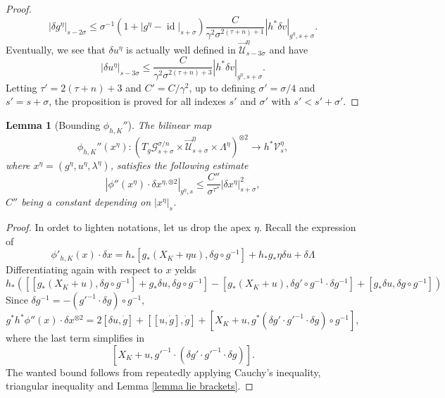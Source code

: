 \documentclass[oneside, 11pt]{amsbook}
\newcommand{\sq}[1]{{\left[#1\right]}}
\newcommand{\abs}[1]{{\left|#1\right|}}
\newcommand{\U}{\mathcal{U}}
\newcommand{\inderiv}[1]{#1'^{-1}}
\newcommand{\pull}[1]{#1^\ast} %
\newcommand{\push}[1]{#1_\ast}%
\newcommand{\id}{\operatorname{id}}
\def\U{{\mathcal U}}
\newcommand{\0}{{(0)}}
\newcommand{\3}{{(3)}}
\newtheorem{lemma}{Lemma}
\numberwithin{equation}{section}
\numberwithin{defn}{section}
\numberwithin{prop}{section}
\numberwithin{cor}{section}
\numberwithin{lemma}{section}
\numberwithin{rmk}{section}
\numberwithin{corollary}{section}
\begin{document}
\begin{proof}
\[\abs{\delta g^\eta}_{s-2\sigma} \leq \sigma^{-1}(1 + \abs{g^\eta - \id}_{s+\sigma}) \frac{C}{\gamma^2\sigma^{2(\tau +n) +1}}\abs{h^*\delta v}_{g^\eta,s+\sigma}. \] 
Eventually, we see that $\delta u^\eta$ is actually well defined in $\overrightarrow{\U}^\eta_{s-3\sigma}$ and have \[\abs{\delta u^\eta}_{s-3\sigma}\leq \frac{C}{\gamma^2\sigma^{2(\tau + n) +3}}\abs{h^*\delta v}_{g^\eta,s+\sigma}.\]
Letting $\tau'= 2(\tau + n) + 3$ and $C'= C/\gamma^2$, up to defining $\sigma' = \sigma/4$ and $s'= s+\sigma$, the proposition is proved for all indexes $s'$ and $\sigma'$ with $s'<s' + \sigma'$.

\end{proof}
\begin{lemma}[Bounding $\phi_{h,K} ''$]
\label{bound phi''}
	The bilinear map
	\[\phi_{h,K} ''(x^\eta) : (T_g\mathcal{G}_{s+\sigma}^{\sigma/n}\times\overrightarrow{\mathcal{U}}^\eta_{s+\sigma}\times\Lambda^\eta)^{\otimes 2}\to h^*\mathcal{V}^\eta_{s}, \] where $x^\eta = (g^\eta,u^\eta,\lambda^\eta)$,
	satisfies the following estimate \[\abs{\phi''(x^\eta)\cdot \delta x^{\eta,\otimes 2}}_{g^\eta,s}\leq \frac{C'' }{\sigma^{\tau ''}} \abs{\delta x^\eta}^{2}_{s+\sigma},\]
	$C''$ being a constant depending on $\abs{x^\eta}_s$.
	\label{lemma derivata seconda}
\end{lemma}

\begin{proof}
	 In ordet to lighten notations, let us drop the apex $\eta$. Recall the expression of 
	$$\phi'_{h,K}(x)\cdot\delta x=  h_* \sq{ g_*(X_K + \eta u), \delta g\circ g^{-1}} + h_*g_*\eta\delta u + \delta\Lambda $$ 
	Differentiating again with respect to $x$ yelds
	\[h_*\left(\sq{\sq{\push{g}(X_K + u),\delta g\circ g^{-1}} + \push{g}\delta u, \delta g\circ g^{-1}}  - \sq{\push{g}(X_K + u), \delta g'\circ g^{-1}\cdot\delta g^{-1}} + \sq{\push{g}\delta u,\delta g\circ g^{-1}}\right) \]
	Since $\delta g^{-1} = - (g'^{-1}\cdot \delta g)\circ g^{-1}$, 
	\[\pull{g}\pull{h}\phi''(x)\cdot \delta x^{\otimes 2} = 2\sq{\delta u, \dot g} + \sq{\sq{u,\dot g}, \dot g} + \sq{X_K + u,\pull{g} (\delta g'\cdot \inderiv{g}\cdot \delta g)\circ g^{-1}}, \] where the last term simplifies in \[\sq{X_K + u,\inderiv{g}\cdot (\delta g'\cdot \inderiv{g}\cdot \delta g)}.\] The wanted bound follows from repeatedly applying Cauchy's inequality, triangular inequality and Lemma \ref{lemma lie brackets}.
	
\end{proof}
\end{document}
